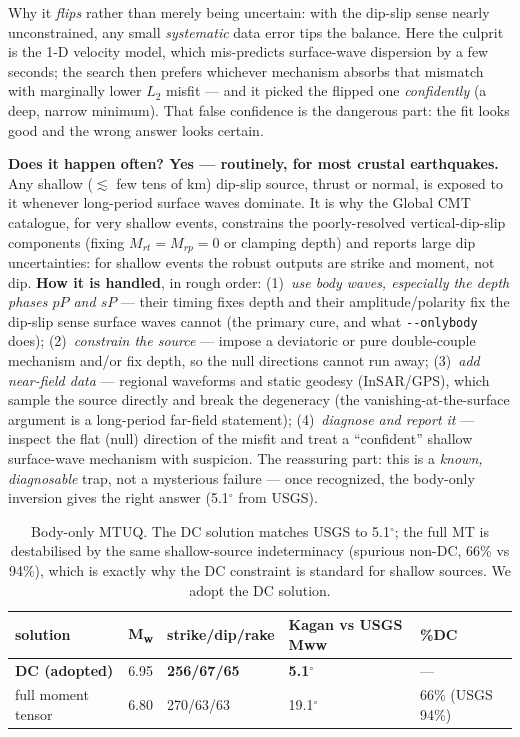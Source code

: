 \documentclass[11pt]{article}
\newcommand{\Mw}{M\textsubscript{w}}
\begin{document}
Why it \emph{flips} rather than merely being uncertain: with the dip-slip sense nearly
unconstrained, any small \emph{systematic} data error tips the balance. Here the culprit is the
1-D velocity model, which mis-predicts surface-wave dispersion by a few seconds; the search then
prefers whichever mechanism absorbs that mismatch with marginally lower $L_2$ misfit --- and it
picked the flipped one \emph{confidently} (a deep, narrow minimum). That false confidence is the
dangerous part: the fit looks good and the wrong answer looks certain.

\textbf{Does it happen often? Yes --- routinely, for most crustal earthquakes.} Any shallow
($\lesssim$ few tens of km) dip-slip source, thrust or normal, is exposed to it whenever
long-period surface waves dominate. It is why the Global CMT catalogue, for very shallow events,
constrains the poorly-resolved vertical-dip-slip components (fixing $M_{rt}=M_{rp}=0$ or clamping
depth) and reports large dip uncertainties: for shallow events the robust outputs are strike and
moment, not dip. \textbf{How it is handled}, in rough order: (1)~\emph{use body waves, especially
the depth phases $pP$ and $sP$} --- their timing fixes depth and their amplitude/polarity fix the
dip-slip sense surface waves cannot (the primary cure, and what \texttt{-{}-onlybody} does);
(2)~\emph{constrain the source} --- impose a deviatoric or pure double-couple mechanism and/or fix
depth, so the null directions cannot run away; (3)~\emph{add near-field data} --- regional
waveforms and static geodesy (InSAR/GPS), which sample the source directly and break the
degeneracy (the vanishing-at-the-surface argument is a long-period far-field statement);
(4)~\emph{diagnose and report it} --- inspect the flat (null) direction of the misfit and treat a
``confident'' shallow surface-wave mechanism with suspicion. The reassuring part: this is a
\emph{known, diagnosable} trap, not a mysterious failure --- once recognized, the body-only
inversion gives the right answer (5.1$^\circ$ from USGS).

\begin{table}[H]\centering\small
\begin{tabular}{lllll}
\toprule
solution & \Mw & strike/dip/rake & Kagan vs USGS Mww & \%DC \\
\midrule
\textbf{DC (adopted)} & 6.95 & \textbf{256/67/65} & \textbf{5.1$^\circ$} & --- \\
full moment tensor & 6.80 & 270/63/63 & 19.1$^\circ$ & 66\% (USGS 94\%) \\
\bottomrule
\end{tabular}
\caption{Body-only MTUQ. The DC solution matches USGS to 5.1$^\circ$; the full MT is destabilised
by the same shallow-source indeterminacy (spurious non-DC, 66\% vs 94\%), which is exactly why
the DC constraint is standard for shallow sources. We adopt the DC solution.}
\end{table}
\end{document}
